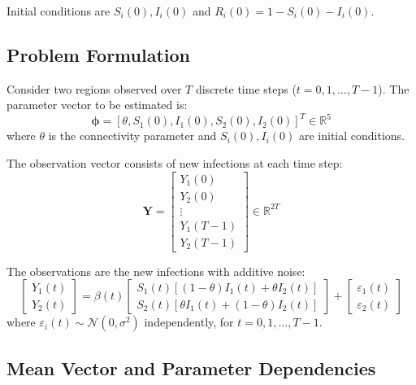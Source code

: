 Initial conditions are $S_i(0), I_i(0)$ and $R_i(0) = 1 - S_i(0) - I_i(0)$.

\subsection{Problem Formulation}

Consider two regions observed over $T$ discrete time steps ($t = 0, 1, \ldots, T-1$). The parameter vector to be estimated is:
\begin{equation}
\boldsymbol{\phi} = [\theta, S_1(0), I_1(0), S_2(0), I_2(0)]^T \in \mathbb{R}^5
\end{equation}
where $\theta$ is the connectivity parameter and $S_i(0), I_i(0)$ are initial conditions.

The observation vector consists of new infections at each time step:
\begin{equation}
\mathbf{Y} = \begin{bmatrix} Y_1(0) \\ Y_2(0) \\ \vdots \\ Y_1(T-1) \\ Y_2(T-1) \end{bmatrix} \in \mathbb{R}^{2T}
\end{equation}

The observations are the new infections with additive noise:
\begin{equation}
\begin{bmatrix} Y_1(t) \\ Y_2(t) \end{bmatrix} = \beta(t) \begin{bmatrix} S_1(t)[(1-\theta) I_1(t) + \theta I_2(t)] \\ S_2(t)[\theta I_1(t) + (1-\theta) I_2(t)] \end{bmatrix} + \begin{bmatrix} \varepsilon_1(t) \\ \varepsilon_2(t) \end{bmatrix}
\end{equation}
where $\varepsilon_i(t) \sim \mathcal{N}(0, \sigma^2)$ independently, for $t = 0, 1, \ldots, T-1$.

\subsection{Mean Vector and Parameter Dependencies}

